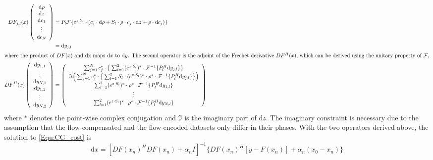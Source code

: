 \begin{align} 
  DF_{j,l}(x) \left( \begin{array}{c}
  \text{d} \rho \\
  \text{d} z \\
  \text{d} c_1 \\
  \vdots \\
  \text{d} c_N
  \end{array} \right) 
  &= P_{l} \mathcal{F} \{ e^{z \cdot S_l} \cdot (c_j \cdot \text{d} \rho + S_l \cdot \rho \cdot c_j \cdot \text{d} z + \rho \cdot \text{d} c_j) \} \label{Equ:der} \\
  &= \text{d} y_{j,l} \\
\intertext{where the product of $DF(x)$ and dx maps d$x$ to d$y$. The second operator is the adjoint of the Frech\'et derivative $DF^H (x)$, which can be derived using the unitary property of $\mathcal{F}$,} 
  DF^{H}(x) \left( \begin{array}{c}
  \text{d}y_{1,1} \\
  \vdots \\
  \text{d}y_{N,1} \\
  \text{d}y_{1,2} \\
  \vdots \\
  \text{d}y_{N,2}
  \end{array} \right) 
  &= \left( \begin{array}{c}
  \sum_{j=1}^{N} c_j^* \cdot \big\{ \sum_{l=1}^{2} (e^{z \cdot S_l})^* \cdot \mathcal{F}^{-1} \{P_l^H \text{d}y_{j,l} \} \big\} \\
  \Im \Big( \sum_{j=1}^{N} c_j^* \cdot \big\{ \sum_{l=1}^{2} S_l \cdot (e^{z \cdot S_l})^* \cdot \rho^* \cdot \mathcal{F}^{-1} \{ P_l^H \text{d}y_{j,l} \} \big\} \Big)\\
  \sum_{l=1}^{2} (e^{z \cdot S_l})^* \cdot \rho^* \cdot \mathcal{F}^{-1} \{ P_l^H \text{d}y_{1,l} \} \\
  \vdots \\
  \sum_{l=1}^{2} (e^{z \cdot S_l})^* \cdot \rho^* \cdot \mathcal{F}^{-1} \{ P_l^H \text{d}y_{N,l} \}
  \end{array} \right) \label{Equ:adj}
\end{align}
where $*$ denotes the point-wise complex conjugation and $\Im$ is the imaginary part of d$z$. The imaginary constraint is necessary due to the assumption that the flow-compensated and the flow-encoded datasets only differ in their phases. With the two operators derived above, the solution to \cref{Equ:CG_cost} is
\begin{equation} \label{Equ:CG_sol}
  \text{d}x = [DF(x_n)^H DF(x_n) + \alpha_n I]^{-1} \{ DF(x_n)^H [y-F(x_n)] + \alpha_n (x_0 - x_n) \}
\end{equation}


